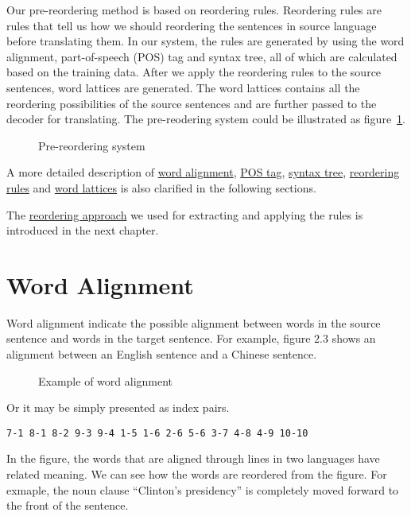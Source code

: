 Our pre-reordering method is based on reordering rules. Reordering rules are rules that tell us how we should reordering the sentences in source language before translating them. In our system, the rules are generated by using the word alignment, part-of-speech (POS) tag and syntax tree, all of which are calculated based on the training data. After we apply the reordering rules to the source sentences, word lattices are generated. The word lattices contains all the reordering possibilities of the source sentences and are further passed to the decoder for translating. The pre-reodering system could be illustrated as figure~\ref{prereordering}.

\begin{figure}
\centering

\caption{Pre-reordering system}
\label{prereordering}
\end{figure}

A more detailed description of \hyperref[ch:Foundations:sec:Alignment]{word alignment}, \hyperref[ch:Foundations:sec:PosTag]{POS tag}, \hyperref[ch:Foundations:sec:SyntacticTree]{syntax tree},
\hyperref[ch:Foundations:sec:types]{reordering rules} and 
\hyperref[ch:Foundations:sec:Lattices]{word lattices} is also clarified in the following sections.

The \hyperref[ch:ReorderingApproach]{reordering approach} we used for extracting and applying the rules is introduced in the next chapter.

\section{Word Alignment}
\label{ch:Foundations:sec:Alignment}

Word alignment indicate the possible alignment between words in the source sentence and words in the target sentence. For example, figure $2.3$ shows an alignment between an English sentence and a Chinese sentence.

\begin{figure}[H]
\centering

\caption{Example of word alignment}
\end{figure}
Or it may be simply presented as index pairs.
\begin{center}
\verb|7-1 8-1 8-2 9-3 9-4 1-5 1-6 2-6 5-6 3-7 4-8 4-9 10-10|
\end{center}

In the figure, the words that are aligned through lines in two languages have related meaning. We can see how the words are reordered from the figure. For exmaple, the noun clause ``Clinton's presidency'' is completely moved forward to the front of the sentence.

